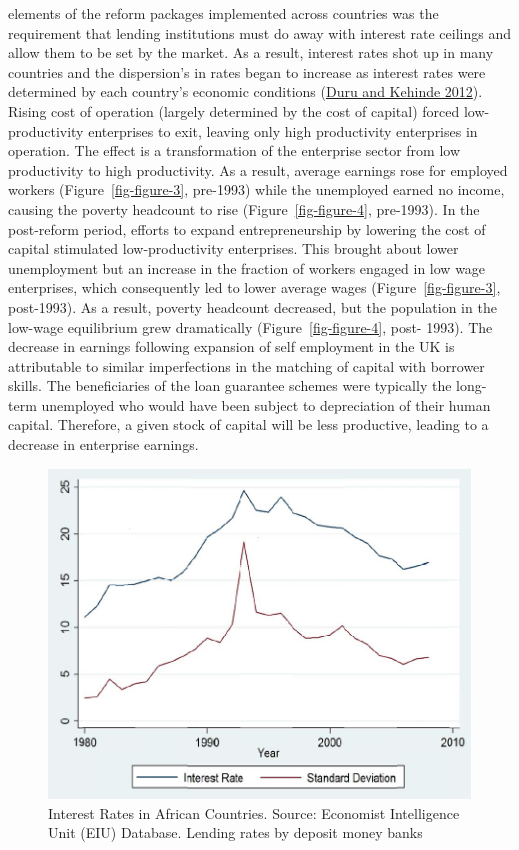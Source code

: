 \documentclass[
  a4paper,
  DIV=11,
  numbers=noendperiod]{scrartcl}
\begin{document}
elements of the reform packages implemented across countries was the
requirement that lending institutions must do away with interest rate
ceilings and allow them to be set by the market. As a result, interest
rates shot up in many countries and the dispersion's in rates began to
increase as interest rates were determined by each country's economic
conditions (\protect\hyperlink{ref-duru2012}{Duru and Kehinde 2012}).
Rising cost of operation (largely determined by the cost of capital)
forced low-productivity enterprises to exit, leaving only high
productivity enterprises in operation. The effect is a transformation of
the enterprise sector from low productivity to high productivity. As a
result, average earnings rose for employed workers
(Figure~\ref{fig-figure-3}, pre-1993) while the unemployed earned no
income, causing the poverty headcount to rise
(Figure~\ref{fig-figure-4}, pre-1993). In the post-reform period,
efforts to expand entrepreneurship by lowering the cost of capital
stimulated low-productivity enterprises. This brought about lower
unemployment but an increase in the fraction of workers engaged in low
wage enterprises, which consequently led to lower average wages
(Figure~\ref{fig-figure-3}, post-1993). As a result, poverty headcount
decreased, but the population in the low-wage equilibrium grew
dramatically (Figure~\ref{fig-figure-4}, post- 1993). The decrease in
earnings following expansion of self employment in the UK is
attributable to similar imperfections in the matching of capital with
borrower skills. The beneficiaries of the loan guarantee schemes were
typically the long-term unemployed who would have been subject to
depreciation of their human capital. Therefore, a given stock of capital
will be less productive, leading to a decrease in enterprise earnings.

\begin{figure}

{\centering \includegraphics{figures/figure-6.png}

}

\caption{\label{fig-figure-6}Interest Rates in African Countries.
Source: Economist Intelligence Unit (EIU) Database. Lending rates by
deposit money banks}

\end{figure}
\end{document}
